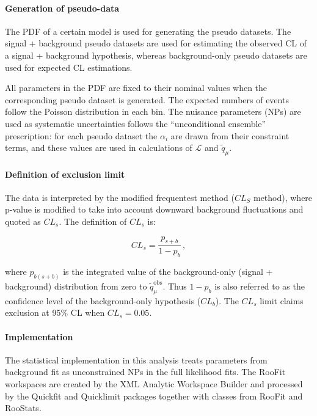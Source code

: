 \paragraph{Generation of pseudo-data\\}

The PDF of a certain model is used for generating the pseudo datasets. The signal + background pseudo datasets are used for estimating the observed CL of a signal + background hypothesis, whereas background-only pseudo
datasets are used for expected CL estimations.

All parameters in the PDF are fixed to their nominal values when the corresponding pseudo dataset is generated. The expected numbers of events follow the Poisson distribution in each bin. The nuisance parameters (NPs) are used as systematic uncertainties follows the ``unconditional ensemble'' prescription: for each pseudo
dataset the $\alpha_i$ are drawn from their constraint terms, and these
values are used in calculations of $\mathcal{L}$ and $\tilde{q}_\mu$.




\paragraph{Definition of exclusion limit\\}

The data is interpreted by the modified frequentest method ($CL_S$ method), where p-value is modified to take into account
downward background fluctuations and quoted as
$CL_s$. The definition of $CL_s$ is:


\begin{equation}
CL_s = \frac{p_{s+b}}{1-p_b}\, ,
\end{equation}

\noindent
where $p_{b(s+b)}$ is the integrated value of the background-only (signal + background) distribution
from zero to $\tilde{q}_\mu^\mathrm{obs}$.
Thus $1 - p_b$ is also referred to as the confidence level of the
background-only hypothesis ($CL_b$). The $CL_s$ limit claims exclusion at 95\% CL when $CL_s = 0.05$.
\paragraph{Implementation\\}
The statistical implementation in this analysis treats parameters from background fit as unconstrained NPs in the full likelihood fits. The RooFit workspaces are created by the XML Analytic Workspace
Builder and processed by the Quickfit and Quicklimit packages together with classes from RooFit and RooStats.  


